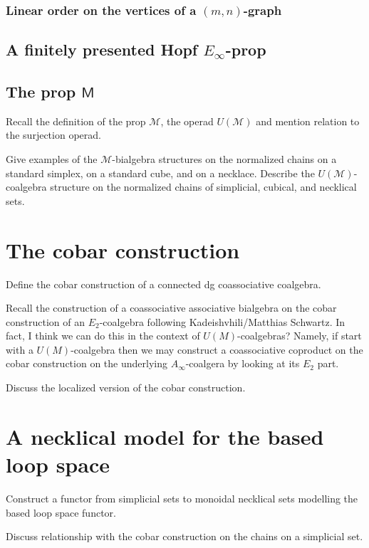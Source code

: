 \documentclass{amsart}
\newcommand{\M}{\mathsf{M}}
\begin{document}
\subsubsection{Linear order on the vertices of a $(m, n)$-graph}

\subsection{A finitely presented Hopf $E_{\infty}$-prop}

\subsection{The prop $\M$}
Recall the definition of the prop $\mathcal{M}$, the operad $U(\mathcal{M})$ and mention relation to the surjection operad. 

Give examples of the $\mathcal{M}$-bialgebra structures on the normalized chains on a standard simplex, on a standard cube, and on a necklace. Describe the $U(\mathcal{M})$-coalgebra structure on the normalized chains of simplicial, cubical, and necklical sets. 

\section{The cobar construction}

Define the cobar construction of a connected dg coassociative coalgebra. 

Recall the construction of a coassociative associative bialgebra on the cobar construction of an $E_2$-coalgebra following Kadeishvhili/Matthias Schwartz. In fact, I think we can do this in the context of $U(M)$-coalgebras? Namely, if start with a $U(M)$-coalgebra then we may construct a coassociative coproduct on the cobar construction on the underlying $A_{\infty}$-coalgera by looking at its $E_2$ part.

Discuss the localized version of the cobar construction.

\section{A necklical model for the based loop space}

Construct a functor from simplicial sets to monoidal necklical sets modelling the based loop space functor. 

Discuss relationship with the cobar construction on the chains on a simplicial set. 
\end{document}
